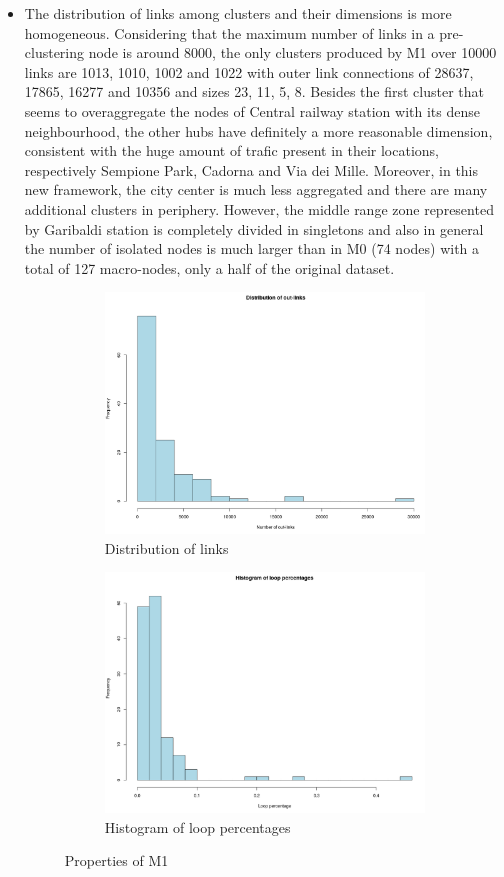 \documentclass[11pt,twoside]{report}
\begin{document}
\begin{itemize}
	\item The distribution of links among clusters and their dimensions is more homogeneous. Considering that the maximum number of links in a pre-clustering node is around 8000, the only clusters produced by M1 over 10000 links are 1013, 1010, 1002 and 1022 with outer link connections of 28637, 17865, 16277 and 10356 and sizes 23, 11, 5, 8. Besides the first cluster that seems to overaggregate the nodes of Central railway station with its dense neighbourhood, the other hubs have definitely a more reasonable dimension, consistent with the huge amount of trafic present in their locations, respectively Sempione Park, Cadorna and Via dei Mille. Moreover, in this new framework, the city center is much less aggregated and there are many additional clusters in periphery. However, the middle range zone represented by Garibaldi station is completely divided in singletons and also in general the number of isolated nodes is much larger than in M0 (74 nodes) with a total of 127 macro-nodes, only a half of the original dataset.
	
	\begin{figure}[H]
		\begin{subfigure}[H]{0.5\linewidth}
			\centering
			\includegraphics[width=70 mm]{pictures/M1_n_links.png}
			\caption{Distribution of links}
			\label{fig:M1_n_links}
		\end{subfigure}
		\hfill
		\begin{subfigure}[H]{0.5\linewidth}
			\centering
			\includegraphics[width=70 mm]{pictures/M1_loop_percentages.png}
			\caption{Histogram of loop percentages}
			\label{fig:loop_distribution_M1}
		\end{subfigure}%
		\caption{Properties of M1}
	\end{figure}


\end{itemize}
\end{document}

